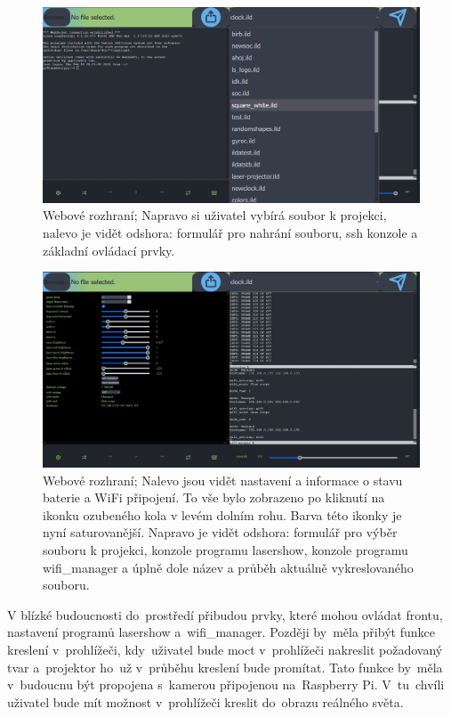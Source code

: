 \begin{figure}[ht]
    \centering
    \includegraphics[width=1\textwidth]{img/ui_ssh-file.jpg}
    \caption{\label{fig:uisshfile} Webové rozhraní; Napravo si uživatel vybírá soubor k projekci, nalevo je vidět odshora: formulář pro nahrání souboru, ssh konzole a základní ovládací prvky.}
\end{figure}

\begin{figure}[ht]
    \centering
    \includegraphics[width=1\textwidth]{img/ui_web_settings.jpg}
    \caption{\label{fig:uiwebsettings} Webové rozhraní; Nalevo jsou vidět nastavení a informace o stavu baterie a WiFi připojení. To vše bylo zobrazeno po kliknutí na ikonku ozubeného kola v levém dolním rohu. Barva této ikonky je nyní saturovanější. Napravo je vidět odshora: formulář pro výběr souboru k projekci, konzole programu lasershow, konzole programu wifi\_manager a úplně dole název a průběh aktuálně vykreslovaného souboru.}
\end{figure}

V blízké budoucnosti do~prostředí přibudou prvky, které mohou ovládat frontu, nastavení programů lasershow a~wifi\_manager. Později by~měla přibýt funkce kreslení v~prohlížeči, kdy~uživatel bude moct v~prohlížeči nakreslit požadovaný tvar a~projektor ho~už v~průběhu kreslení bude promítat. Tato funkce by~měla v~budoucnu být propojena s~kamerou připojenou na~Raspberry Pi. V~tu~chvíli uživatel bude mít možnost v~prohlížeči kreslit do~obrazu reálného světa.

